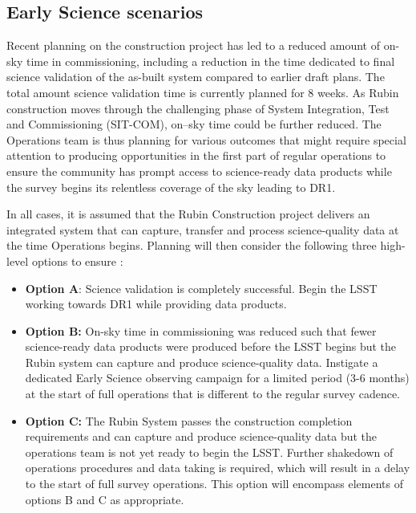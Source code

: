 \subsection{Early Science scenarios } \label{ssec:scenarios}


Recent planning on the construction project has led to a reduced amount of on-sky time in commissioning, including a reduction in the time dedicated to final science validation of the as-built system compared to earlier draft plans.
The total amount science validation time is currently planned for 8 weeks.
As Rubin construction moves through the challenging phase of System Integration, Test and Commissioning (SIT-COM), on--sky time could be further reduced.
The Operations team is thus planning for various outcomes that might require special attention to producing \es opportunities in the first part of regular operations to ensure the community has prompt access to science-ready data products while the survey begins its relentless coverage of the sky leading to DR1.


In all cases, it is assumed that the Rubin Construction project delivers an integrated system that can capture, transfer and process science-quality data at the time Operations begins.
Planning will then consider the following three high-level options to ensure \es:
\begin{itemize}
\item \textbf{Option A}:
Science validation is completely successful.
Begin the LSST working towards DR1 while providing \es data products.
\item \textbf{Option B:}
On-sky time in commissioning was reduced such that fewer science-ready data products were produced before the LSST begins but the Rubin system can capture and produce science-quality data.
Instigate a dedicated Early Science observing campaign for a limited period (3-6 months) at the start of full operations that is different to the regular survey cadence.
\item \textbf{Option C:}
The Rubin System  passes the construction completion requirements and can capture and produce science-quality data but the operations team is not yet ready to begin the LSST.
Further shakedown of operations procedures and data taking is required, which will result in a delay to the start of full survey operations.
This option will encompass elements of options B and C as appropriate.
\end{itemize}

